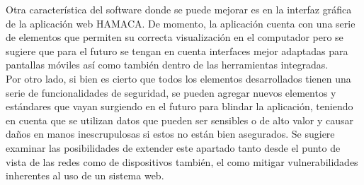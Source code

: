 Otra característica del software donde se puede mejorar es en la interfaz gráfica de la aplicación web HAMACA. De momento, la aplicación cuenta con una serie de elementos que permiten su correcta visualización en el computador pero se sugiere que para el futuro se tengan en cuenta interfaces mejor adaptadas para pantallas móviles así como también dentro de las herramientas integradas.\\

Por otro lado, si bien es cierto que todos los elementos desarrollados tienen una serie de funcionalidades de seguridad, se pueden agregar nuevos elementos y estándares que vayan surgiendo en el futuro para blindar la aplicación, teniendo en cuenta que se utilizan datos que pueden ser sensibles o de alto valor y causar daños en manos inescrupulosas si estos no están bien asegurados. Se sugiere examinar las posibilidades de extender este apartado tanto desde el punto de vista de las redes como de dispositivos también, el como mitigar vulnerabilidades inherentes al uso de un sistema web. 